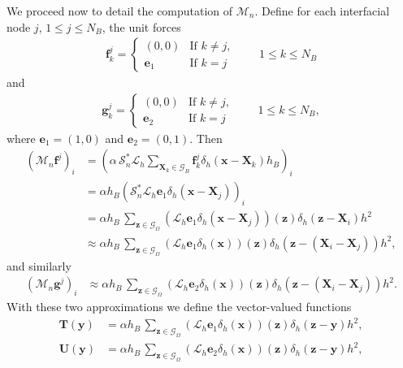 \documentclass[preprint,12pt]{elsarticle}
\begin{document}
We proceed now to detail the computation of $\mathcal{M}_n$.  
Define for each interfacial node $j$, $1 \leq j \leq N_B$, the unit forces
\begin{align}
\mathbf{f}^j_k = 
\begin{cases}
(0,0)
 & \text{If $k \neq j$}, \\
\mathbf{e}_1 & \text{If $k=j$}
\end{cases} \qquad 1 \leq k \leq N_B \label{eq:f}
\end{align}
and
\begin{align}
\mathbf{g}^j_k =
\begin{cases}
(0,0)
 & \text{If $k \neq j$}, \\
\mathbf{e}_2 & \text{If $k=j$}
\end{cases} \qquad 1 \leq k \leq N_B, \label{eq:g}
\end{align}
where $\mathbf{e}_1=(1,0)$ and $\mathbf{e}_2=(0,1)$.
Then
\begin{align}
(\mathcal{M}_n \mathbf{f}^j)_i &=
\left( \alpha \,  \mathcal{S}^*_n \mathcal{L}_h 
\sum_{\mathbf{X}_k \in \mathcal{G}_B}  \mathbf{f}^j_k \delta_h (\mathbf{x}-\mathbf{X}_k) h_B \right)_i  \\
&= \alpha  h_B \left(  \mathcal{S}^*_n \mathcal{L}_h   \mathbf{e}_1 \delta_h (\mathbf{x}-\mathbf{X}_j)  \right)_i \\
&=\alpha h_B  \, \sum_{\mathbf{z} \in \mathcal{G}_\Omega} \left(\mathcal{L}_h   \mathbf{e}_1 \delta_h (\mathbf{x}-\mathbf{X}_j) \right)
(\mathbf{z}) \delta_h(\mathbf{z}-\mathbf{X}_i)h^2 \\
& \approx  \alpha h_B  \, \sum_{\mathbf{z} \in \mathcal{G}_\Omega} \left( \mathcal{L}_h   \mathbf{e}_1 \delta_h (\mathbf{x}) \right) (\mathbf{z})
\delta_h\left(\mathbf{z}-(\mathbf{X}_i-\mathbf{X}_j)\right)h^2,
\end{align}
and similarly
\begin{align}
(\mathcal{M}_n \mathbf{g}^j)_i  & \approx  \alpha h_B  \, \sum_{\mathbf{z} \in \mathcal{G}_\Omega} \left( \mathcal{L}_h   \mathbf{e}_2 \delta_h (\mathbf{x}) \right) (\mathbf{z})
\delta_h\left(\mathbf{z}-(\mathbf{X}_i-\mathbf{X}_j)\right)h^2.
\end{align}
With these two approximations we define the vector-valued functions
\begin{align}
\mathbf{T}(\mathbf{y}) &=  \alpha h_B \, \sum_{\mathbf{z} \in \mathcal{G}_\Omega} \left(  \mathcal{L}_h \mathbf{e}_1 \delta_h (\mathbf{x}) \right) (\mathbf{z}) \delta_h\left(\mathbf{z}-\mathbf{y}\right)h^2, \\
\mathbf{U}(\mathbf{y}) &=  \alpha h_B \, \sum_{\mathbf{z} \in \mathcal{G}_\Omega}  \left( \mathcal{L}_h \mathbf{e}_2 \delta_h (\mathbf{x}) \right) (\mathbf{z}) \delta_h\left(\mathbf{z}-\mathbf{y}\right)h^2,
 \end{align}
\end{document}
